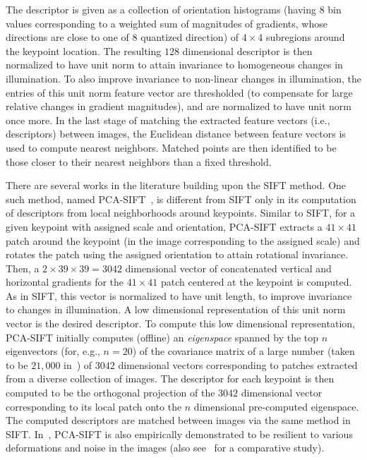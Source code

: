 \documentclass[10pt]{article}
\begin{document}
The descriptor is given as a collection of orientation histograms (having $8$ bin values corresponding to a weighted sum of magnitudes of gradients, whose directions are close to one of $8$ quantized direction) of $4\times4$ subregions around the keypoint location. The resulting $128$ dimensional descriptor is then normalized to have unit norm to attain invariance to homogeneous changes in illumination. To also improve invariance to non-linear changes in illumination, the entries of this unit norm feature vector are thresholded (to compensate for large relative changes in gradient magnitudes), and are normalized to have unit norm once more. In the last stage of matching the extracted feature vectors (i.e., descriptors) between images, the Euclidean distance between feature vectors is used to compute nearest neighbors. Matched points are then identified to be those closer to their nearest neighbors than a fixed threshold.

There are several works in the literature building upon the SIFT method. One such method, named PCA-SIFT~\cite{PCASIFT}, is different from SIFT only in its computation of descriptors from local neighborhoods around keypoints. Similar to SIFT, for a given keypoint with assigned scale and orientation, PCA-SIFT extracts a $41\times41$ patch around the keypoint (in the image corresponding to the assigned scale) and rotates the patch using the assigned orientation to attain rotational invariance. Then, a $2\times39\times39=3042$ dimensional vector of concatenated vertical and horizontal gradients for the $41\times41$ patch centered at the keypoint is computed. As in SIFT, this vector is normalized to have unit length, to improve invariance to changes in illumination. A low dimensional representation of this unit norm vector is the desired descriptor. To compute this low dimensional representation, PCA-SIFT initially computes (offline) an \textit{eigenspace} spanned by the top $n$ eigenvectors (for, e.g., $n=20$) of the covariance matrix of a large number (taken to be $21,000$ in~\cite{PCASIFT}) of $3042$ dimensional vectors corresponding to patches extracted from a diverse collection of images. The descriptor for each keypoint is then computed to be the orthogonal projection of the $3042$ dimensional vector corresponding to its local patch onto the $n$ dimensional pre-computed eigenspace. The computed descriptors are matched between images via the same method in SIFT. In~\cite{PCASIFT}, PCA-SIFT is also empirically demonstrated to be resilient to various deformations and noise in the images (also see~\cite{GLOH} for a comparative study). 
\end{document}
